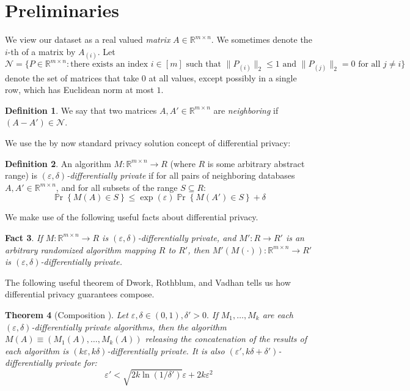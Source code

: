 \documentclass[letterpaper,11pt]{article}
\newtheorem{theorem}{Theorem}[section]
\newtheorem{fact}[theorem]{Fact}
\theoremstyle{definition}
\newtheorem{definition}[theorem]{Definition}
\newcommand{\Psymb}{\mathbb{P}}
\DeclareMathOperator*{\ProbOp}{\Psymb r}
\renewcommand{\Pr}{\ProbOp}
\renewcommand{\leq}{\leqslant}
\newcommand{\Set}[1]{\left\{#1\right\}}
\renewcommand{\epsilon}{\varepsilon}
\begin{document}
\section{Preliminaries}
We view our dataset as a real valued \emph{matrix} $A\in\mathbb{R}^{m\times
n}.$ We sometimes denote the  $i$-th of a matrix by $A_{(i)}.$
Let
\begin{equation}
\mathcal{N} = \{P \in \mathbb{R}^{m\times n} : \textrm{there exists
an index } i \in [m] \textrm{ such that } \|P_{(i)}\|_2 \leq 1 \textrm{ and }
\|P_{(j)}\|_2 = 0 \textrm{ for all } j\neq i\}
\end{equation}
denote the set of matrices
that take $0$ at all values, except possibly in a single row, which has
Euclidean norm at most $1$.
\begin{definition} We say that two matrices $A,
A' \in \mathbb{R}^{m\times n}$ are \emph{neighboring} if $(A - A') \in
\mathcal{N}$.
\end{definition}
We use the by now standard privacy solution concept of differential privacy:
\begin{definition}
An algorithm $M\colon\mathbb{R}^{m\times n}\rightarrow R$ (where $R$ is some
arbitrary abstract range) is \emph{$(\epsilon,\delta)$-differentially private}
if for all pairs of neighboring databases $A, A' \in \mathbb{R}^{m\times n}$, and for
all subsets of the range $S \subseteq R$:
\[
\Pr\Set{M(A) \in S} \leq
\exp(\epsilon)\Pr\Set{M(A') \in S} + \delta\]
\end{definition}

We make use of the following useful facts about differential privacy.
\begin{fact}
If $M:\mathbb{R}^{m\times n}\rightarrow R$ is $(\epsilon,\delta)$-differentially private, and $M':R\rightarrow R'$ is an arbitrary randomized algorithm mapping $R$ to $R'$, then $M'(M(\cdot)):\mathbb{R}^{m\times n}\rightarrow R'$ is $(\epsilon,\delta)$-differentially private.
\end{fact}

The following useful theorem of Dwork, Rothblum, and Vadhan tells us how differential privacy guarantees compose.
\begin{theorem}[Composition \cite{DworkRV10}]
\label{thm:composition}
Let $\epsilon,\delta\in(0,1),\delta'>0.$
If $M_1, \ldots, M_k$ are each $(\epsilon,\delta)$-differentially private
algorithms, then the algorithm $M(A)
\equiv (M_1(A),\ldots,M_k(A))$ releasing the concatenation of the results of
each algorithm is $(k\epsilon, k\delta)$-differentially private. It is also $(\epsilon', k\delta + \delta')$-differentially private for:
$$\epsilon' < \sqrt{2k\ln(1/\delta')}\epsilon + 2k\epsilon^2$$
\end{theorem}
\end{document}
